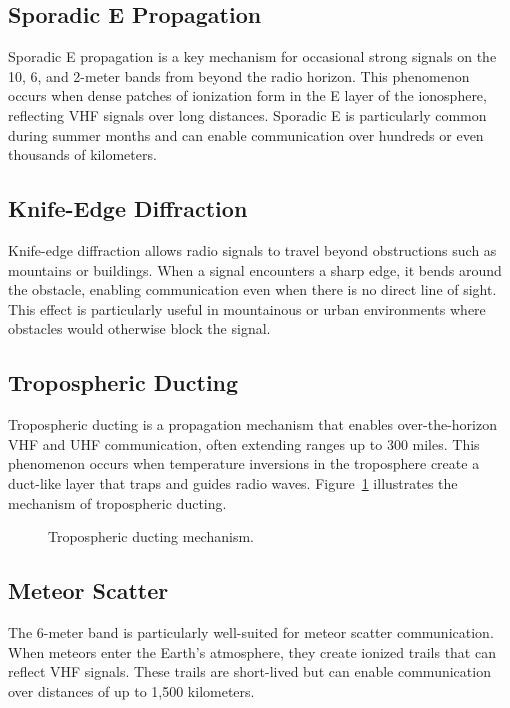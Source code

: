 \subsection*{Sporadic E Propagation}
Sporadic E propagation is a key mechanism for occasional strong signals on the 10, 6, and 2-meter bands from beyond the radio horizon. This phenomenon occurs when dense patches of ionization form in the E layer of the ionosphere, reflecting VHF signals over long distances. Sporadic E is particularly common during summer months and can enable communication over hundreds or even thousands of kilometers.

\subsection*{Knife-Edge Diffraction}
Knife-edge diffraction allows radio signals to travel beyond obstructions such as mountains or buildings. When a signal encounters a sharp edge, it bends around the obstacle, enabling communication even when there is no direct line of sight. This effect is particularly useful in mountainous or urban environments where obstacles would otherwise block the signal.

\subsection*{Tropospheric Ducting}
Tropospheric ducting is a propagation mechanism that enables over-the-horizon VHF and UHF communication, often extending ranges up to 300 miles. This phenomenon occurs when temperature inversions in the troposphere create a duct-like layer that traps and guides radio waves. Figure~\ref{fig:tropospheric_ducting} illustrates the mechanism of tropospheric ducting.

\begin{figure}[h!]
    \centering
    \caption{Tropospheric ducting mechanism.}
    \label{fig:tropospheric_ducting}
\end{figure}

\subsection*{Meteor Scatter}
The 6-meter band is particularly well-suited for meteor scatter communication. When meteors enter the Earth's atmosphere, they create ionized trails that can reflect VHF signals. These trails are short-lived but can enable communication over distances of up to 1,500 kilometers.

